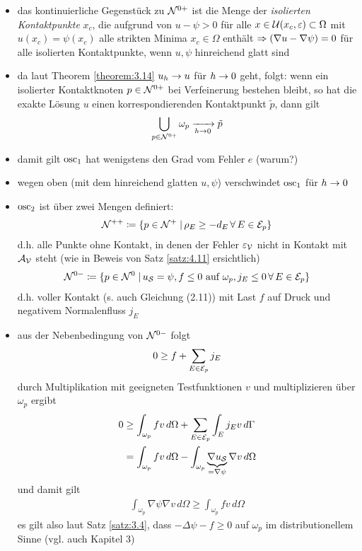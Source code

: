 \begin{itemize}
\item das kontinuierliche Gegenstück zu $\mathcal N^{0+}$ ist die Menge der \textit{isolierten Kontaktpunkte} $x_c$, die aufgrund von $u-\psi >0$ für alle $x \in \mathcal U(x_c, \varepsilon) \subset \Omega$ mit $u(x_c) = \psi(x_c)$ alle strikten Minima $x_c \in \Omega$ enthält $\Rightarrow (\nabla u -\nabla \psi) = 0$ für alle isolierten Kontaktpunkte, wenn $u, \psi$ hinreichend glatt sind

\item da laut Theorem \ref{theorem:3.14} $u_h \rightarrow u$ für $h\rightarrow 0$ geht, folgt: wenn ein isolierter Kontaktknoten $p \in \mathcal N^{0+}$ bei Verfeinerung bestehen bleibt, so hat die exakte Lösung $u$ einen korrespondierenden Kontaktpunkt $\tilde p$, dann gilt
\begin{align*}
	\bigcup_{p \in \mathcal N^{0+}} \omega_p \xrightarrow[h\rightarrow 0]{} \tilde p
\end{align*}

\item damit gilt $\operatorname{osc}_1$ hat wenigstens den Grad vom Fehler $e$ (warum?)

\item wegen oben (mit dem hinreichend glatten $u, \psi$) verschwindet $\operatorname{osc}_1$ für $h \rightarrow 0$

\item $\operatorname{osc}_2$ ist über zwei Mengen definiert:
\begin{align}
	\mathcal N^{++} \coloneqq \{p \in \mathcal N^{+}\;\vert\, \rho_E \ge - d_E \, \forall \, E \in \mathcal E_p\}
\end{align}
d.h. alle Punkte ohne Kontakt, in denen der Fehler $\varepsilon_{\mathcal V}$ nicht in Kontakt mit $\mathcal A_{\mathcal V}$ steht (wie in Beweis von Satz \ref{satz:4.11} ersichtlich)
\begin{align}
	\mathcal N^{0-}\coloneqq \{ p \in \mathcal N^0 \;\vert\, u_{\mathcal S} = \psi , f \le 0 \text{ auf } \omega_p, j_E \le 0 \, \forall \, E \in \mathcal E_p \}
\end{align}
d.h. voller Kontakt (s. auch \cite{SiebVee} Gleichung (2.11)) mit Last $f$ auf Druck und negativem Normalenfluss $j_E$

\item aus der Nebenbedingung von $\mathcal N^{0-}$ folgt
\begin{align*}
	0 \ge f + \sum_{E \in \mathcal E_p} j_E
\end{align*}
durch Multiplikation mit geeigneten Testfunktionen $v$ und multiplizieren über $\omega_p$ ergibt
\begin{align*}
	0 &  \ge \int_{\omega_p} f v \, d\Omega + \sum_{E\in \mathcal E_p} \int_E j_E v \, d \Gamma \\
	& = \int_{\omega_p} f v \, d \Omega - \int_{\omega_p} \underbrace{\nabla u_{\mathcal S}}_{=\nabla \psi} \nabla v \, d\Omega
\end{align*}
und damit gilt
\begin{align}
	 \int_{\omega_p} {\nabla \psi} \nabla v \, d\Omega \ge \int_{\omega_p} f v \, d \Omega
\end{align}
es gilt also laut Satz \ref{satz:3.4}, dass $-\Delta \psi - f \ge 0$ auf $\omega_p$ im distributionellem Sinne (vgl. auch \cite{Walker} Kapitel 3)


\end{itemize}
